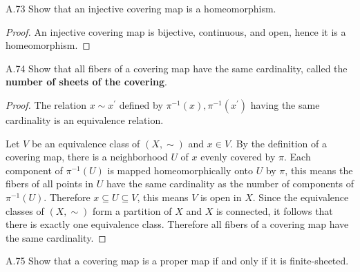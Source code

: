 \begin{exercise}{A.73}
    Show that an injective covering map is a homeomorphism.
\end{exercise}

\begin{proof}
    An injective covering map is bijective, continuous, and open, hence it is a homeomorphism.
\end{proof}

\begin{exercise}{A.74}
    Show that all fibers of a covering map have the same cardinality, called the \textbf{number of sheets of the covering}.
\end{exercise}

\begin{proof}
    The relation \( x \sim x^{\prime} \) defined by \( \pi^{-1}(x), \pi^{-1}(x^{\prime}) \) having the same cardinality is an equivalence relation.

    Let \( V \) be an equivalence class of \( (X, \sim) \) and \( x \in V \). By the definition of a covering map, there is a neighborhood \( U \) of \( x \) evenly covered by \( \pi \). Each component of \( \pi^{-1}(U) \) is mapped homeomorphically onto \( U \) by \( \pi \), this means the fibers of all points in \( U \) have the same cardinality as the number of components of \( \pi^{-1}(U) \). Therefore \( x \subseteq U \subseteq V \), this means \( V \) is open in \( X \). Since the equivalence classes of \( (X, \sim) \) form a partition of \( X \) and \( X \) is connected, it follows that there is exactly one equivalence class. Therefore all fibers of a covering map have the same cardinality.
\end{proof}

\begin{exercise}{A.75}
    Show that a covering map is a proper map if and only if it is finite-sheeted.
\end{exercise}


